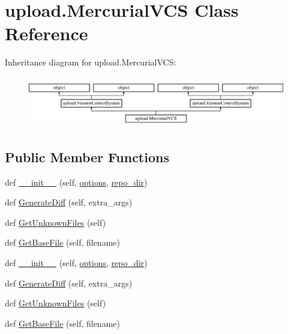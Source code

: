 \hypertarget{classupload_1_1_mercurial_v_c_s}{}\section{upload.\+Mercurial\+V\+CS Class Reference}
\label{classupload_1_1_mercurial_v_c_s}
Inheritance diagram for upload.\+Mercurial\+V\+CS\+:\begin{figure}[H]
\begin{center}
\leavevmode
\includegraphics[height=2.245989cm]{d2/de0/classupload_1_1_mercurial_v_c_s}
\end{center}
\end{figure}
\subsection*{Public Member Functions}
\begin{DoxyCompactItemize}
\item 
def \mbox{\hyperlink{classupload_1_1_mercurial_v_c_s_a33890f442dedbb7d9fd45c08b5baed56}{\+\_\+\+\_\+init\+\_\+\+\_\+}} (self, \mbox{\hyperlink{classupload_1_1_version_control_system_a4d57d043bc408887b94269fe4cea9556}{options}}, \mbox{\hyperlink{classupload_1_1_mercurial_v_c_s_a219c1e0ab9ce864e3231913762ea489b}{repo\+\_\+dir}})
\item 
def \mbox{\hyperlink{classupload_1_1_mercurial_v_c_s_a6c05746012d8cd435c94ace1465671ef}{Generate\+Diff}} (self, extra\+\_\+args)
\item 
def \mbox{\hyperlink{classupload_1_1_mercurial_v_c_s_a6190899fb86cd09ad84cc5d4b0ebd2f3}{Get\+Unknown\+Files}} (self)
\item 
def \mbox{\hyperlink{classupload_1_1_mercurial_v_c_s_a0cdc0cbe6ac4daab82f5f01e6ae2e670}{Get\+Base\+File}} (self, filename)
\item 
def \mbox{\hyperlink{classupload_1_1_mercurial_v_c_s_a33890f442dedbb7d9fd45c08b5baed56}{\+\_\+\+\_\+init\+\_\+\+\_\+}} (self, \mbox{\hyperlink{classupload_1_1_version_control_system_a4d57d043bc408887b94269fe4cea9556}{options}}, \mbox{\hyperlink{classupload_1_1_mercurial_v_c_s_a219c1e0ab9ce864e3231913762ea489b}{repo\+\_\+dir}})
\item 
def \mbox{\hyperlink{classupload_1_1_mercurial_v_c_s_a6c05746012d8cd435c94ace1465671ef}{Generate\+Diff}} (self, extra\+\_\+args)
\item 
def \mbox{\hyperlink{classupload_1_1_mercurial_v_c_s_a6190899fb86cd09ad84cc5d4b0ebd2f3}{Get\+Unknown\+Files}} (self)
\item 
def \mbox{\hyperlink{classupload_1_1_mercurial_v_c_s_a0cdc0cbe6ac4daab82f5f01e6ae2e670}{Get\+Base\+File}} (self, filename)
\end{DoxyCompactItemize}
